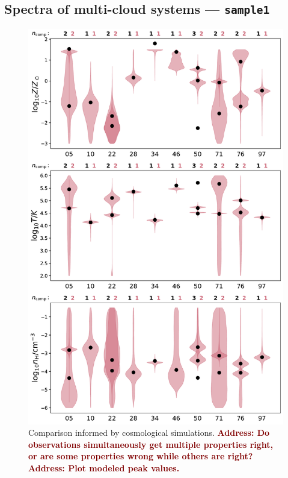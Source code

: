 \documentclass[fleqn,usenatbib]{mnras}
\newcommand{\todo}[1]{\textcolor{Maroon}{\textbf{Address: #1}}}
\begin{document}
\subsection{Spectra of multi-cloud systems --- \texttt{sample1}}
\label{s: results -- sample1}

\begin{figure}
    \centering
    \includegraphics[width=\columnwidth]{figures/sample1/comparison.pdf}
    \caption{
    Comparison informed by cosmological simulations.
    \todo{Do observations simultaneously get multiple properties right, or are some properties wrong while others are right?}
    \todo{Plot modeled peak values.}
    }
    \label{f: informed}
\end{figure}
\end{document}
